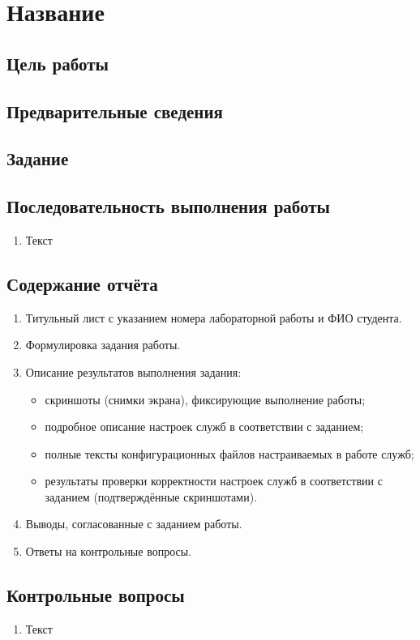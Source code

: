 \chapter{Название}

\section{Цель работы}

\section{Предварительные сведения}

\section{Задание}


\section{Последовательность выполнения работы}
\begin{enumerate}
\item Текст
\end{enumerate}


\section{Содержание отчёта}

\begin{enumerate}
\item Титульный лист с указанием номера лабораторной работы и ФИО студента.
\item Формулировка задания работы.
\item Описание результатов выполнения задания:
  \begin{itemize}
  \item скриншоты (снимки экрана), фиксирующие выполнение  работы;
  \item подробное описание настроек служб в соответствии с заданием;
  \item полные тексты конфигурационных файлов настраиваемых в работе
    служб;
  \item результаты проверки корректности настроек служб в соответствии
    с заданием (подтверждённые скриншотами).
  \end{itemize}
\item Выводы, согласованные с заданием работы.
\item Ответы на контрольные вопросы.
\end{enumerate}


\section{Контрольные вопросы}

\begin{enumerate}
\item Текст
\end{enumerate}

\printbibliography[heading=subbibliography,resetnumbers=true]


